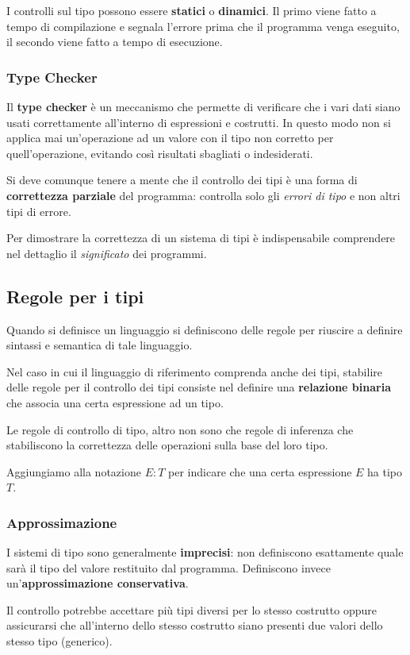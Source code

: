 I controlli sul tipo possono essere \textbf{statici} o \textbf{dinamici}. Il primo viene fatto a tempo di compilazione e
segnala l'errore prima che il programma venga eseguito, il secondo viene fatto a tempo di esecuzione.

\subsubsection{Type Checker}
Il \textbf{type checker} è un meccanismo che permette di verificare che i vari dati siano usati correttamente all'interno di
espressioni e costrutti. In questo modo non si applica mai un'operazione ad un valore con il tipo non corretto per
quell'operazione, evitando così risultati sbagliati o indesiderati.

Si deve comunque tenere a mente che il controllo dei tipi è una forma di \textbf{correttezza parziale} del programma:
controlla solo gli \emph{errori di tipo} e non altri tipi di errore.

Per dimostrare la correttezza di un sistema di tipi è indispensabile comprendere nel dettaglio il \emph{significato} dei
programmi.

\subsection{Regole per i tipi}
Quando si definisce un linguaggio si definiscono delle regole per riuscire a definire sintassi e semantica di tale
linguaggio.

Nel caso in cui il linguaggio di riferimento comprenda anche dei tipi, stabilire delle regole per il controllo dei tipi
consiste nel definire una \textbf{relazione binaria} che associa una certa espressione ad un tipo.

Le regole di controllo di tipo, altro non sono che regole di inferenza che stabiliscono la correttezza delle operazioni
sulla base del loro tipo.

Aggiungiamo alla notazione $E : T$ per indicare che una certa espressione $E$ ha tipo $T$.

\subsubsection{Approssimazione}
I sistemi di tipo sono generalmente \textbf{imprecisi}: non definiscono esattamente quale sarà il tipo del valore restituito
dal programma. Definiscono invece un'\textbf{approssimazione conservativa}.

Il controllo potrebbe accettare più tipi diversi per lo stesso costrutto oppure assicurarsi che all'interno dello stesso
costrutto siano presenti due valori dello stesso tipo (generico).

